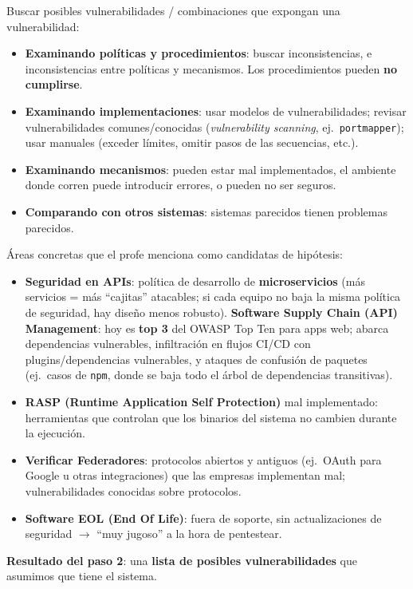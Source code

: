 \documentclass[../main.tex]{subfiles}
\begin{document}
Buscar posibles vulnerabilidades / combinaciones que expongan una vulnerabilidad:
\begin{itemize}
    \item \textbf{Examinando políticas y procedimientos}: buscar inconsistencias, e
    inconsistencias entre políticas y mecanismos. Los procedimientos pueden \textbf{no
    cumplirse}.
    \item \textbf{Examinando implementaciones}: usar modelos de vulnerabilidades; revisar
    vulnerabilidades comunes/conocidas (\emph{vulnerability scanning}, ej.\ \texttt{portmapper});
    usar manuales (exceder límites, omitir pasos de las secuencias, etc.).
    \item \textbf{Examinando mecanismos}: pueden estar mal implementados, el ambiente donde
    corren puede introducir errores, o pueden no ser seguros.
    \item \textbf{Comparando con otros sistemas}: sistemas parecidos tienen problemas parecidos.
\end{itemize}

Áreas concretas que el profe menciona como candidatas de hipótesis:
\begin{itemize}
    \item \textbf{Seguridad en APIs}: política de desarrollo de \textbf{microservicios}
    (más servicios = más ``cajitas'' atacables; si cada equipo no baja la misma política de
    seguridad, hay diseño menos robusto). \textbf{Software Supply Chain (API) Management}:
    hoy es \textbf{top 3} del OWASP Top Ten para apps web; abarca dependencias vulnerables,
    infiltración en flujos CI/CD con plugins/dependencias vulnerables, y ataques de
    confusión de paquetes (ej.\ casos de \texttt{npm}, donde se baja todo el árbol de
    dependencias transitivas).
    \item \textbf{RASP (Runtime Application Self Protection)} mal implementado: herramientas
    que controlan que los binarios del sistema no cambien durante la ejecución.
    \item \textbf{Verificar Federadores}: protocolos abiertos y antiguos (ej.\ OAuth para
    Google u otras integraciones) que las empresas implementan mal; vulnerabilidades
    conocidas sobre protocolos.
    \item \textbf{Software EOL (End Of Life)}: fuera de soporte, sin actualizaciones de
    seguridad $\rightarrow$ ``muy jugoso'' a la hora de pentestear.
\end{itemize}

\textbf{Resultado del paso 2}: una \textbf{lista de posibles vulnerabilidades} que asumimos
que tiene el sistema.
\end{document}
